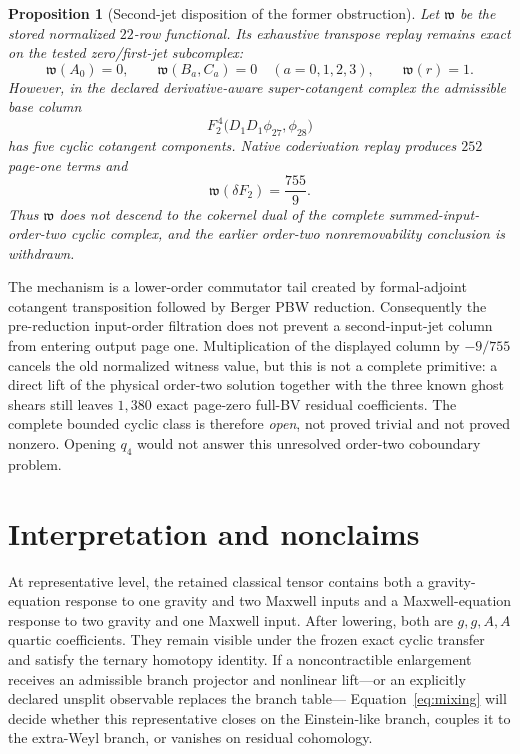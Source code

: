 \documentclass[11pt]{article}
\newtheorem{proposition}[theorem]{Proposition}
\theoremstyle{definition}
\theoremstyle{remark}
\begin{document}
\begin{proposition}[Second-jet disposition of the former obstruction]
\label{thm:filtered-disposition}
Let $\mathfrak w$ be the stored normalized $22$-row functional.  Its
exhaustive transpose replay remains exact on the tested zero/first-jet
subcomplex:
\begin{equation}
 \mathfrak w(A_0)=0,
 \qquad \mathfrak w(B_a,C_a)=0\quad(a=0,1,2,3),
 \qquad \mathfrak w(r)=1.
\end{equation}
However, in the declared derivative-aware super-cotangent complex the
admissible base column
\begin{equation}
 F_2^{\,4}\bigl(D_1D_1\phi_{27},\phi_{28}\bigr)
\end{equation}
has five cyclic cotangent components.  Native coderivation replay produces
$252$ page-one terms and
\begin{equation}
 \mathfrak w\!\left(\delta F_2\right)=\frac{755}{9}.
\end{equation}
Thus $\mathfrak w$ does not descend to the cokernel dual of the complete
summed-input-order-two cyclic complex, and the earlier order-two
nonremovability conclusion is withdrawn.
\end{proposition}

The mechanism is a lower-order commutator tail created by formal-adjoint
cotangent transposition followed by Berger PBW reduction.  Consequently the
pre-reduction input-order filtration does not prevent a second-input-jet
column from entering output page one.  Multiplication of the displayed column
by $-9/755$ cancels the old normalized witness value, but this is not a
complete primitive: a direct lift of the physical order-two solution together
with the three known ghost shears still leaves $1{,}380$ exact page-zero
full-BV residual coefficients.  The complete bounded cyclic class is
therefore \emph{open}, not proved trivial and not proved nonzero.  Opening
$q_4$ would not answer this unresolved order-two coboundary problem.

\section{Interpretation and nonclaims}\label{sec:interpretation}

At representative level, the retained classical tensor contains both a
gravity-equation response to one gravity and two Maxwell inputs and a
Maxwell-equation response to two gravity and one Maxwell input.  After
lowering, both are $g,g,A,A$ quartic coefficients.  They remain visible under
the frozen exact cyclic transfer and satisfy the ternary homotopy identity.
If a noncontractible enlargement receives an admissible branch projector and
nonlinear lift---or an explicitly declared unsplit observable replaces the
branch table---
Equation~\eqref{eq:mixing} will decide whether this representative closes on
the Einstein-like branch, couples it to the extra-Weyl branch, or vanishes on
residual cohomology.
\end{document}
